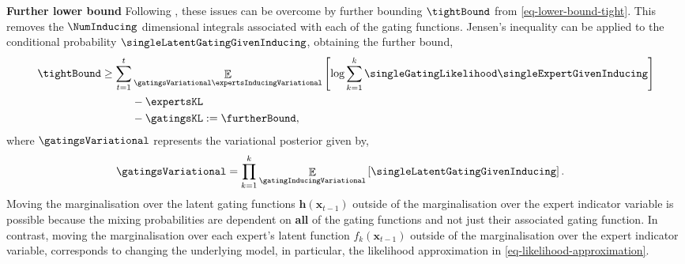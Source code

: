 \documentclass{mimosis-class/mimosis}
\numberwithin{equation}{chapter}
\DeclareMathOperator{\E}{\mathbb{E}}
\newcommand{\numData}{\ensuremath{t}}
\newcommand{\modeInd}{\ensuremath{k}}
\newcommand{\NumData}{\ensuremath{\MakeUppercase{\numData}}}
\newcommand{\ModeInd}{\ensuremath{\MakeUppercase{\modeInd}}}
\newcommand{\mode}[1]{\ensuremath{#1_{\modeInd}}}
\newcommand{\x}{\ensuremath{\mathbf{x}}}
\newcommand{\singleInput}{\ensuremath{\x_{\numData-1}}}
\newcommand{\gatingFunc}{\ensuremath{h}}
\newcommand{\GatingFunc}{\ensuremath{\mathbf{\gatingFunc}}}
\newcommand{\latentFunc}{\ensuremath{f}}
\begin{document}
{\textbf{Further lower bound} Following \cite{hensmanScalable2015}, these issues can be overcome
by further bounding \(\tightBound\) from \cref{eq-lower-bound-tight}.
This removes the \(\NumInducing\) dimensional integrals associated with each of the gating functions.
Jensen's inequality can be applied to the conditional probability \(\singleLatentGatingGivenInducing\),
obtaining the further bound,
\begin{align} \label{eq-lower-bound-further}
\tightBound \geq \sum_{\numData=1}^\NumData &\E_{\gatingsVariational \expertsInducingVariational}
\left[ \text{log} \sum_{\modeInd=1}^{\ModeInd} \singleGatingLikelihood \singleExpertGivenInducing \right] \nonumber \\
&- \expertsKL \nonumber \\
&- \gatingsKL := \furtherBound,
\end{align}
where \(\gatingsVariational\) represents the variational posterior given by,
\begin{align} \label{eq-variational-posteriors-gating}
\gatingsVariational &= \prod_{\modeInd=1}^\ModeInd \E_{\gatingInducingVariational} \left[ \singleLatentGatingGivenInducing \right].
\end{align}
Moving the marginalisation over the latent gating functions \(\GatingFunc(\singleInput)\)
outside of the marginalisation over the expert indicator
variable is possible because the mixing probabilities are dependent on \textbf{all} of the gating functions and
not just their associated gating function.
In contrast, moving the marginalisation over each expert's latent function \(\mode{\latentFunc}(\singleInput)\)
outside of the marginalisation over the expert
indicator variable, corresponds to changing the underlying model, in particular, the likelihood
approximation in \cref{eq-likelihood-approximation}.

}
\end{document}
